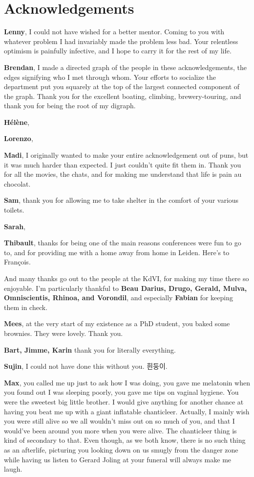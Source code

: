 \chapter*{Acknowledgements}
{\bfseries Lenny}, I could not have wished for a better mentor. Coming to you with whatever problem I had invariably made the problem less bad. Your relentless optimism is painfully infective, and I hope to carry it for the rest of my life.

{\bfseries Brendan}, I made a directed graph of the people in these acknowledgements, the edges signifying who I met through whom. Your efforts to socialize the department put you squarely at the top of the largest connected component of the graph. Thank you for the excellent boating, climbing, brewery-touring, and thank you for being the root of my digraph.

{\bfseries H\'el\`ene},

{\bfseries Lorenzo},

{\bfseries Madi}, I originally wanted to make your entire acknowledgement out of puns, but it was much harder than expected. I just couldn't quite fit them in. Thank you for all the movies, the chats, and for making me understand that life is pain au chocolat.

{\bfseries Sam}, thank you for allowing me to take shelter in the comfort of your various toilets.

{\bfseries Sarah},

{\bfseries Thibault}, thanks for being one of the main reasons conferences were fun to go to, and for providing me with a home away from home in Leiden. Here's to Fran\c{c}ois.

And many thanks go out to the people at the KdVI, for making my time there so enjoyable. I'm particularly thankful to {\bfseries Beau Darius, Drugo, Gerald, Mulva, Omniscientis, Rhinoa, and Vorondil}, and especially {\bfseries Fabian} for keeping them in check.  

{\bfseries Mees}, at the very start of my existence as a PhD student, you baked some brownies. They were lovely. Thank you.

{\bfseries Bart, Jimme, Karin} thank you for literally everything.

{\bfseries Sujin}, I could not have done this without you. 흰둥이.

{\bfseries Max}, you called me up just to ask how I was doing, you gave me melatonin when you found out I was sleeping poorly, you gave me tips on vaginal hygiene. You were the sweetest big little brother. I would give anything for another chance at having you beat me up with a giant inflatable chanticleer. Actually, I mainly wish you were still alive so we all wouldn't miss out on so much of you, and that I would've been around you more when you were alive. The chanticleer thing is kind of secondary to that. Even though, as we both know, there is no such thing as an afterlife, picturing you looking down on us smugly from the danger zone while having us listen to Gerard Joling at your funeral will always make me laugh.
